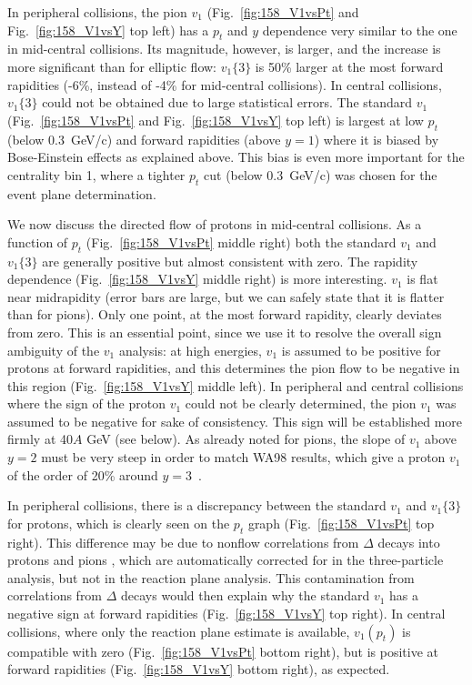 \documentclass[aps,prc,superscriptaddress,showpacs,floatfix,nofootinbib]{revtex4}
\begin{document}
In peripheral collisions, the pion $v_1$ (Fig.~\ref{fig:158_V1vsPt}
and Fig.~\ref{fig:158_V1vsY} top left) has a $p_t$ and $y$ dependence
very similar to the one in mid-central collisions.  Its magnitude,
however, is larger, and the increase is more significant than for
elliptic flow: $v_1\{3\}$ is 50\% larger at the most forward
rapidities (-6\%, instead of -4\% for mid-central collisions).  In
central collisions, $v_1\{3\}$ could not be obtained due to large
statistical errors.  The standard $v_1$ (Fig.~\ref{fig:158_V1vsPt} and
Fig.~\ref{fig:158_V1vsY} top left) is largest at low $p_t$ (below
0.3~GeV/c) and forward rapidities (above $y=1$) where it is biased by
Bose-Einstein effects as explained above.  This bias is even more
important for the centrality bin 1, where a tighter $p_t$ cut (below
0.3~GeV/c) was chosen for the event plane determination.

We now discuss the directed flow of protons in mid-central collisions.
As a function of $p_t$ (Fig.~\ref{fig:158_V1vsPt} middle right) both
the standard $v_1$ and $v_1\{3\}$ are generally positive but almost
consistent with zero.  The rapidity dependence
(Fig.~\ref{fig:158_V1vsY} middle right) is more interesting. $v_1$ is
flat near midrapidity (error bars are large, but we can safely state
that it is flatter than for pions). Only one point, at the most
forward rapidity, clearly deviates from zero.  This is an essential
point, since we use it to resolve the overall sign ambiguity of the
$v_1$ analysis: at high energies, $v_1$ is assumed to be positive for
protons at forward rapidities, and this determines the pion flow to be
negative in this region (Fig.~\ref{fig:158_V1vsY} middle left).  In
peripheral and central collisions where the sign of the proton $v_1$
could not be clearly determined, the pion $v_1$ was assumed to be
negative for sake of consistency.  This sign will be established more
firmly at 40$A$ GeV (see below).  As already noted for pions, the
slope of $v_1$ above $y=2$ must be very steep in order to match WA98
results, which give a proton $v_1$ of the order of 20\% around
$y=3$~\cite{Aggarwal:1998vg}.

In peripheral collisions, there is a discrepancy between the standard
$v_1$ and $v_1\{3\}$ for protons, which is clearly seen on the $p_t$
graph (Fig.~\ref{fig:158_V1vsPt} top right).  This difference may be
due to nonflow correlations from $\Delta$ decays into protons and
pions \cite{Borghini:2000cm}, which are automatically corrected for in
the three-particle analysis, but not in the reaction plane analysis.
This contamination from correlations from $\Delta$ decays would then
explain why the standard $v_1$ has a negative sign at forward
rapidities (Fig.~\ref{fig:158_V1vsY} top right).  In central
collisions, where only the reaction plane estimate is available,
$v_1(p_t)$ is compatible with zero (Fig.~\ref{fig:158_V1vsPt} bottom
right), but is positive at forward rapidities
(Fig.~\ref{fig:158_V1vsY} bottom right), as expected.
\end{document}
